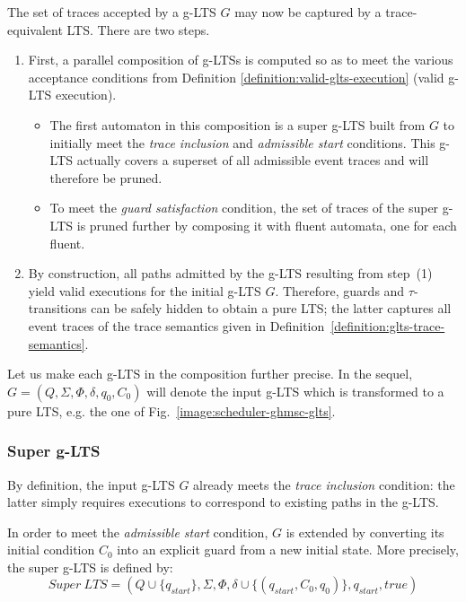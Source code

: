 The set of traces accepted by a g-LTS $G$ may now be captured by a trace-equivalent LTS. There are two steps.
\begin{enumerate}[(1)]
\item First, a parallel composition of g-LTSs is computed so as to meet the various acceptance conditions from Definition \ref{definition:valid-glts-execution} (valid g-LTS execution).
\begin{itemize}
\item The first automaton in this composition is a super g-LTS built from $G$ to initially meet the \emph{trace inclusion} and \emph{admissible start} conditions. This g-LTS actually covers a superset of all admissible event traces and will therefore be pruned.
\item To meet the \emph{guard satisfaction} condition, the set of traces of the super g-LTS is pruned further by composing it with fluent automata, one for each fluent.
\end{itemize}
\item By construction, all paths admitted by the g-LTS resulting from step~(1) yield valid executions for the initial g-LTS $G$. Therefore, guards and $\tau$-transitions can be safely hidden to obtain a pure LTS; the latter captures all event traces of the trace semantics given in Definition~\ref{definition:glts-trace-semantics}.
\end{enumerate}

Let us make each g-LTS in the composition further precise. In the sequel, $G = (Q,\Sigma,\Phi,\delta,q_{0},C_{0})$ will denote the input g-LTS which is transformed to a pure LTS, e.g. the one of Fig.~\ref{image:scheduler-ghmsc-glts}. 

\subsubsection*{Super g-LTS}

By definition, the input g-LTS $G$ already meets the \emph{trace inclusion} condition: the latter simply requires executions to correspond to existing paths in the g-LTS.

In order to meet the \emph{admissible start} condition, $G$ is extended by converting its initial condition $C_0$ into an explicit guard from a new initial state. More precisely, the super g-LTS is defined by:
\begin{equation*}
Super~LTS = (Q \cup \{ q_{start} \}, \Sigma, \Phi, \delta \cup \{(q_{start},C_0,q_0)\},q_{start},true)
\end{equation*}

